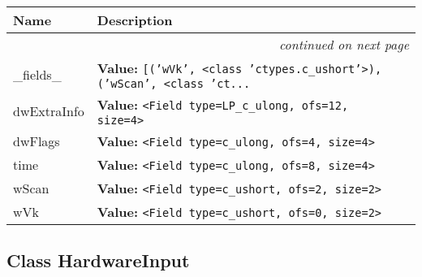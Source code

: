     \vspace{-1cm}
\hspace{\varindent}\begin{longtable}{|p{\varnamewidth}|p{\vardescrwidth}|l}
\cline{1-2}
\cline{1-2} \centering \textbf{Name} & \centering \textbf{Description}& \\
\cline{1-2}
\endhead\cline{1-2}\multicolumn{3}{r}{\small\textit{continued on next page}}\\\endfoot\cline{1-2}
\endlastfoot\raggedright \_\-f\-i\-e\-l\-d\-s\-\_\- & \raggedright \textbf{Value:} 
{\tt \texttt{[}\texttt{(}\texttt{'}\texttt{wVk}\texttt{'}\texttt{, }{\textless}class 'ctypes.c\_ushort'{\textgreater}\texttt{)}\texttt{, }\texttt{(}\texttt{'}\texttt{wScan}\texttt{'}\texttt{, }{\textless}class 'ct\texttt{...}}&\\
\cline{1-2}
\raggedright d\-w\-E\-x\-t\-r\-a\-I\-n\-f\-o\- & \raggedright \textbf{Value:} 
{\tt {\textless}Field type=LP\_c\_ulong, ofs=12, size=4{\textgreater}}&\\
\cline{1-2}
\raggedright d\-w\-F\-l\-a\-g\-s\- & \raggedright \textbf{Value:} 
{\tt {\textless}Field type=c\_ulong, ofs=4, size=4{\textgreater}}&\\
\cline{1-2}
\raggedright t\-i\-m\-e\- & \raggedright \textbf{Value:} 
{\tt {\textless}Field type=c\_ulong, ofs=8, size=4{\textgreater}}&\\
\cline{1-2}
\raggedright w\-S\-c\-a\-n\- & \raggedright \textbf{Value:} 
{\tt {\textless}Field type=c\_ushort, ofs=2, size=2{\textgreater}}&\\
\cline{1-2}
\raggedright w\-V\-k\- & \raggedright \textbf{Value:} 
{\tt {\textless}Field type=c\_ushort, ofs=0, size=2{\textgreater}}&\\
\cline{1-2}
\end{longtable}



\subsection{Class HardwareInput}

